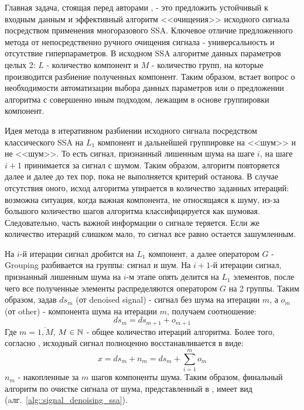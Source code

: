 Главная задача, стоящая перед авторами \cite{kuang2020efficient}, - это предложить устойчивый к входным данным  и эффективный алгоритм <<очищения>> исходного сигнала посредством применения многоразового SSA. Ключевое отличие предложенного метода от непосредственно ручного очищения сигнала - универсальность и отсутствие гиперпараметров. В исходном SSA алгоритме данных параметров целых 2: $L$ - количество компонент и $M$ - количество групп, на которые производится разбиение полученных компонент. Таким образом, встает вопрос о необходимости автоматизации выбора данных параметров или о предложении алгоритма с совершенно иным подходом, лежащим в основе группировки компонент.

Идея метода в итеративном разбиении исходного сигнала посредством классического SSA на $L_1$ компонент и дальнейшей группировке на <<шум>> и не <<шум>>.  То есть сигнал, признанный лишенным шума на шаге  $i$, на шаге $i + 1$ принимается за сигнал с шумом. Таким образом, алгоритм повторяется далее и далее до тех пор, пока не выполняется критерий останова. В случае отсутствия оного, исход алгоритма упирается в количество заданных итераций: возможна ситуация, когда важная компонента, не относящаяся к шуму, из-за большого количество шагов алгоритма классифицируется как шумовая. Следовательно, часть важной информации о сигнале теряется. Если же количество итераций слишком мало, то сигнал все равно остается зашумленным.

На $i$-й итерации сигнал дробится на $L_1$ компонент, а далее оператором $G$ - Grouping разбивается на группы: сигнал и шум. На $i + 1$-й итерации сигнал, признанный лишенным шума на $i$-м этапе опять делится на $L_1$ элементов, после чего все полученные элементы распределяются оператором $G$ на 2 группы. Таким образом, задав $ds_m$ (от denoised signal) - сигнал без шума на итерации $m$, а $o_m$ (от other) - компонента шума на итерации $m$, получаем соотношение:
\begin{equation}
	ds_m = ds_{m + 1} + o_{m + 1}
\end{equation}
Где $m = \overline{1, M}$, $M \in \mathbb{N}$ - общее количество итераций алгоритма. Более того, согласно \cite{kuang2020efficient}, исходный сигнал полноценно восстанавливается в виде:
\begin{equation}
	x = ds_m + n_m = ds_m + \sum_{i = 1}^m o_m
\end{equation}
$n_m$ - накопленные за $m$ шагов компоненты шума. Таким образом, финальный алгоритм по очистке сигнала от шума, представленный в \cite{kuang2020efficient}, имеет вид (aлг.~\ref{alg::signal_denoising_ssa}). 

